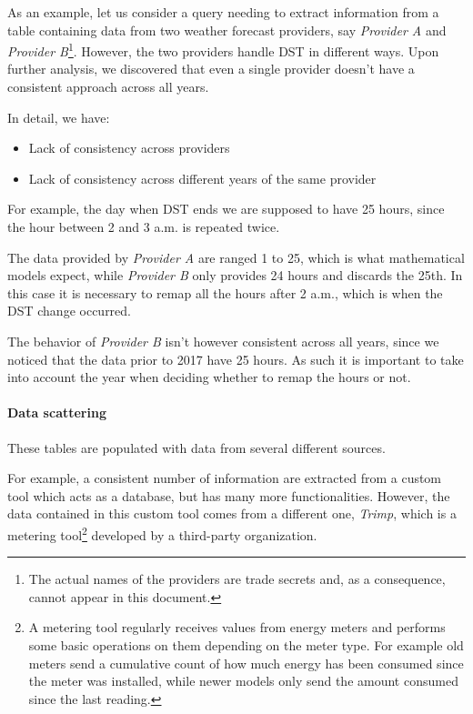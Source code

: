         As an example, let us consider a query needing to extract information from a table containing data from two weather forecast providers, say \textit{Provider A} and \textit{Provider B}\footnote{
            The actual names of the providers are trade secrets and, as a consequence, cannot appear in this document.
        }.
        However, the two providers handle DST in different ways.
        Upon further analysis, we discovered that even a single provider doesn't have a consistent approach across all years.
        
        In detail, we have:
            \begin{itemize}
                \item Lack of consistency across providers
                \item Lack of consistency across different years of the same provider
            \end{itemize}

        For example, the day when DST ends we are supposed to have 25 hours, since the hour between 2 and 3 a.m. is repeated twice.
        
        The data provided by \textit{Provider A} are ranged 1 to 25, which is what mathematical models expect, while \textit{Provider B} only provides 24 hours and discards the 25th.
        In this case it is necessary to remap all the hours after 2 a.m., which is when the DST change occurred.
        
        The behavior of \textit{Provider B} isn't however consistent across all years, since we noticed that the data prior to 2017 have 25 hours.
        As such it is important to take into account the year when deciding whether to remap the hours or not.
        
    \paragraph{Data scattering}
        These tables are populated with data from several different sources.
        
        For example, a consistent number of information are extracted from a custom tool which acts as a database, but has many more functionalities.
        However, the data contained in this custom tool comes from a different one, \textit{Trimp}, which is a metering tool\footnote{
            A metering tool regularly receives values from energy meters and performs some basic operations on them depending on the meter type.
            For example old meters send a cumulative count of how much energy has been consumed since the meter was installed, while newer models only send the amount consumed since the last reading.
        } developed by a third-party organization.
        
